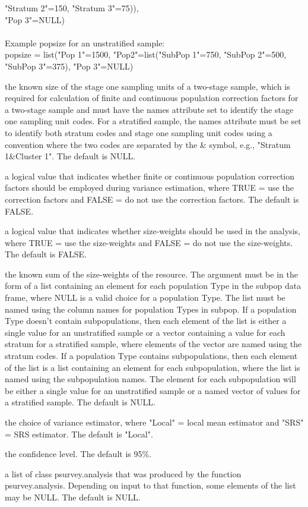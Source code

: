 \begin{Arguments}
\begin{ldescription}
"Stratum 2"=150, "Stratum 3"=75)),\\ "Pop 3"=NULL)\\\\
Example popsize for an unstratified sample:\\
popsize = list("Pop 1"=1500, "Pop2"=list("SubPop 1"=750,
"SubPop 2"=500, "SubPop 3"=375), "Pop 3"=NULL)\\
\item[\code{stage1size}] the known size of the stage one sampling units of a 
two-stage sample, which is required for calculation of finite and  
continuous population correction factors for a two-stage sample and 
must have the names attribute set to identify the stage one sampling 
unit codes.  For a stratified sample, the names attribute must be set
to identify both stratum codes and stage one sampling unit codes using
a convention where the two codes are separated by the \& symbol, e.g.,
"Stratum 1\&Cluster 1".  The default is NULL.
\item[\code{popcorrect}] a logical value that indicates whether finite or continuous 
population correction factors should be employed during variance 
estimation, where TRUE = use the correction factors and FALSE = do not 
use the correction factors.  The default is FALSE.
\item[\code{sizeweight}] a logical value that indicates whether size-weights should 
be used in the analysis, where TRUE = use the size-weights and FALSE = 
do not use the size-weights.  The default is FALSE.
\item[\code{unitsize}] the known sum of the size-weights of the resource.  The 
argument must be in the form of a list containing an element for each  
population Type in the subpop data frame, where NULL is a valid choice  
for a population Type.  The list must be named using the column  
names for population Types in subpop.  If a population Type doesn't  
contain subpopulations, then each element of the list is either a  
single value for an unstratified sample or a vector containing a value  
for each stratum for a stratified sample, where elements of the vector
are named using the stratum codes.  If a population Type contains 
subpopulations, then each element of the list is a list containing an 
element for each subpopulation, where the list is named using the 
subpopulation names.  The element for each subpopulation will be 
either a single value for an unstratified sample or a named vector of 
values for a stratified sample.  The default is NULL.
\item[\code{vartype}] the choice of variance estimator, where "Local" = local mean
estimator and "SRS" = SRS estimator.  The default is "Local".
\item[\code{conf}] the confidence level.  The default is 95\%.
\item[\code{psurvey.obj}] a list of class psurvey.analysis that was produced by the
function psurvey.analysis.  Depending on input to that function,
some elements of the list may be NULL.  The default is NULL.
\end{ldescription}
\end{Arguments}
